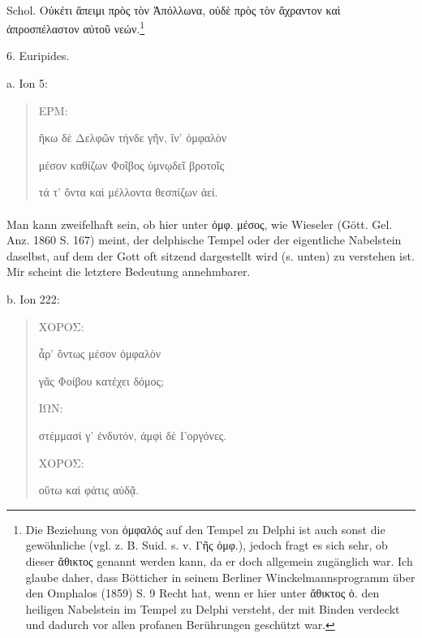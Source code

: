\documentclass[a4paper, 11pt, oneside]{article}
\begin{document}
\paragraph{}
Schol. Οὐκέτι ἄπειμι πρὸς τὸν Ἀπόλλωνα, οὐδὲ πρὸς τὸν ἄχραντον καὶ ἀπροσπέλαστον αὐτοῦ νεών.\footnote{Die Beziehung von ὀμφαλός auf den Tempel zu Delphi ist auch sonst die gewöhnliche (vgl. z. B. Suid. s. v. Γῆς ὀμφ.), jedoch fragt es sich sehr, ob dieser ἄθικτος genannt werden kann, da er doch allgemein zugänglich war. Ich glaube daher, dass Bötticher in seinem Berliner Winckelmannsprogramm über den Omphalos (1859) S. 9 Recht hat, wenn er hier unter ἄθικτος ὀ. den heiligen Nabelstein im Tempel zu Delphi versteht, der mit Binden verdeckt und dadurch vor allen profanen Berührungen geschützt war.}

6. Euripides.

a. Ion 5:
\begin{quotation}
ΕΡΜ:

ἥκω δὲ Δελφῶν τήνδε γῆν, ἵν' ὀμφαλὸν

μέσον καθίζων Φοῖβος ὑμνῳδεῖ βροτοῖς

τά τ' ὄντα καὶ μέλλοντα θεσπίζων ἀεί.
\end{quotation}
\paragraph{}
Man kann zweifelhaft sein, ob hier unter ὀμφ. μέσος, wie Wieseler (Gött. Gel. Anz. 1860 S. 167) meint, der delphische Tempel oder der eigentliche Nabelstein daselbst, auf dem der Gott oft sitzend dargestellt wird (s. unten) zu verstehen ist. Mir scheint die letztere Bedeutung annehmbarer.

b. Ion 222:
\begin{quotation}
ΧΟΡΟΣ:

ἆρ' ὄντως μέσον ὀμφαλὸν

γᾶς Φοίβου κατέχει δόμος;

ΙΩΝ:

στέμμασί γ' ἐνδυτόν, ἀμφὶ δὲ Γοργόνες.

ΧΟΡΟΣ:

οὕτω καὶ φάτις αὐδᾷ.
\end{quotation}
\end{document}
